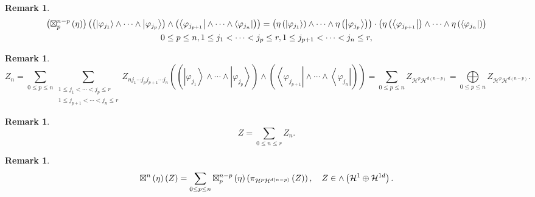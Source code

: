 \documentclass[aps,preprint]{revtex4}%
\newtheorem{remark}[theorem]{Remark}
\begin{document}
\begin{remark}%
\begin{gather}
\left(  {\large \boxtimes}_{p}^{n-p}\left(  \eta\right)  \right)  \left(
\left(  \left\vert \varphi_{j_{1}}\right\rangle \wedge\cdots\wedge\left\vert
\varphi_{j_{p}}\right\rangle \right)  \wedge\left(  \left\langle
\varphi_{j_{p+1}}\right\vert \wedge\cdots\wedge\left\langle \varphi_{j_{n}%
}\right\vert \right)  \right)  =\left(  \eta\left(  \left\vert \varphi_{j_{1}%
}\right\rangle \right)  \wedge\cdots\wedge\eta\left(  \left\vert
\varphi_{j_{p}}\right\rangle \right)  \right)  \cdot\left(  \eta\left(
\left\langle \varphi_{j_{p+1}}\right\vert \right)  \wedge\cdots\wedge
\eta\left(  \left\langle \varphi_{j_{n}}\right\vert \right)  \right) \\
0\leq p\leq n,1\leq j_{1}<\cdots<j_{p}\leq r,1\leq j_{p+1}<\cdots<j_{n}\leq r,
\end{gather}

\end{remark}

\begin{remark}%
\begin{equation}
Z_{n}=\sum_{0\leq p\leq n}\sum_{\substack{1\leq j_{1}<\cdots<j_{p}\leq
r\\1\leq j_{p+1}<\cdots<j_{n}\leq r}}Z_{nj_{1}\cdots j_{p}j_{p+1}\cdots j_{n}%
}\left(  \left(  \left\vert \varphi_{j_{1}}\right\rangle \wedge\cdots
\wedge\left\vert \varphi_{j_{p}}\right\rangle \right)  \wedge\left(
\left\langle \varphi_{j_{p+1}}\right\vert \wedge\cdots\wedge\left\langle
\varphi_{j_{n}}\right\vert \right)  \right)  =\sum_{0\leq p\leq n}%
Z_{\mathcal{H}^{p}\mathcal{H}^{d\left(  n-p\right)  }}=%
{\textstyle\bigoplus\limits_{0\leq p\leq n}}
Z_{\mathcal{H}^{p}\mathcal{H}^{d\left(  n-p\right)  }}.
\end{equation}

\end{remark}

\begin{remark}%
\begin{equation}
Z=\sum_{0\leq n\leq r}Z_{n}.
\end{equation}

\end{remark}

\begin{remark}%
\begin{equation}
{\large \boxtimes}^{n}\left(  \eta\right)  \left(  Z\right)  =\sum_{0\leq
p\leq n}{\large \boxtimes}_{p}^{n-p}\left(  \eta\right)  \left(
\pi_{\mathcal{H}^{p}\mathcal{H}^{d\left(  n-p\right)  }}\left(  Z\right)
\right)  ,\quad Z\in{\huge \wedge}\left(  \mathcal{H}^{1}\oplus\mathcal{H}%
^{1d}\right)  .
\end{equation}

\end{remark}
\end{document}
